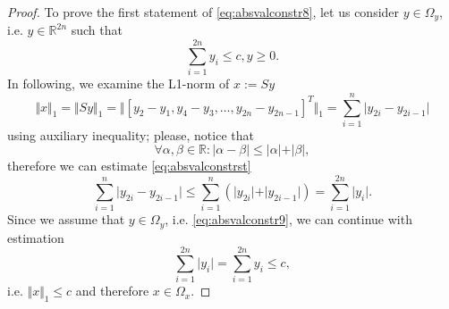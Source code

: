 \begin{proof}
\vspace{0.5cm}

\noindent To prove the first statement of \eqref{eq:absvalconstr8}, let us consider $y \in \Omega_y$, i.e. $y \in \mathbb{R}^{2n}$ such that
\begin{equation}
 \label{eq:absvalconstr9}
 \sum\limits_{i = 1}^{2n} y_i \leq c, y \geq 0.
\end{equation}
In following, we examine the L1-norm of $x := Sy$
\begin{equation}
 \label{eq:absvalconstrst}
 \Vert x \Vert_1 = \Vert Sy \Vert_1 = \Vert [y_2 - y_1, y_4 - y_3, \dots, y_{2n} - y_{2n-1}]^T \Vert_1 = \sum\limits_{i =1}^n \vert y_{2i} - y_{2i-1} \vert
\end{equation}
using auxiliary inequality; please, notice that
\begin{displaymath}
 \forall \alpha, \beta \in \mathbb{R}: \vert \alpha - \beta \vert \leq \vert \alpha \vert + \vert \beta \vert,
\end{displaymath}
therefore we can estimate \eqref{eq:absvalconstrst}
\begin{displaymath}
 \sum\limits_{i = 1}^{n} \vert y_{2i} - y_{2i-1} \vert \leq \sum\limits_{i=1}^n \left( \vert y_{2i} \vert + \vert y_{2i-1} \vert \right) = \sum\limits_{i=1}^{2n} \vert y_i \vert .
\end{displaymath}
Since we assume that $y \in \Omega_y$, i.e. \eqref{eq:absvalconstr9}, we can continue with estimation
\begin{displaymath}
 \sum\limits_{i=1}^{2n} \vert y_i \vert = \sum\limits_{i=1}^{2n} y_i  \leq c,
\end{displaymath}
i.e. $\Vert x \Vert_1 \leq c$ and therefore $x \in \Omega_x$. \newline

\vspace{0.5cm}


\end{proof}
